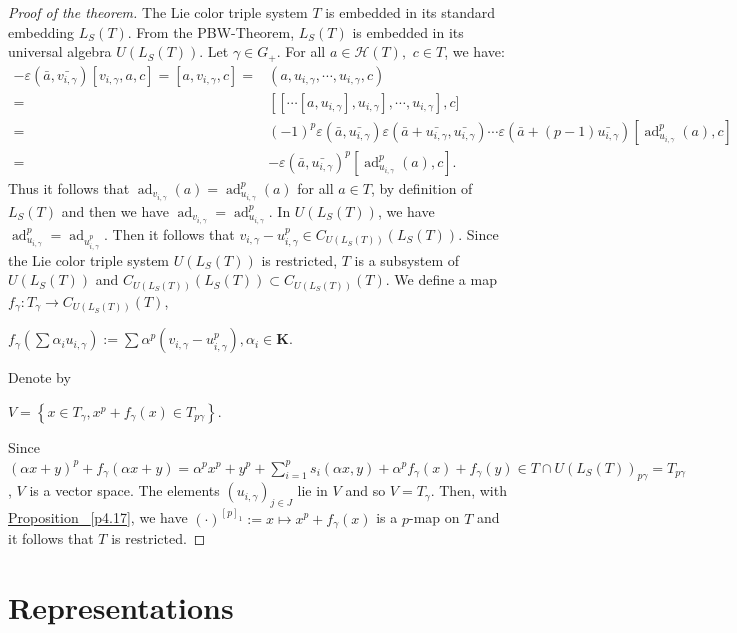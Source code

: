 \documentclass[11pt, twoside]{article}
\DeclareMathOperator{\ad}{ad}
\begin{document}
\begin{proof}[Proof of the theorem]
    The Lie color triple system $T$ is embedded in its standard embedding $L_S(T)$. From the PBW-Theorem, $L_S(T) $ is embedded in its universal algebra $U(L_S(T)) $. Let $\gamma\in G_+ $. For all $a\in \mathcal{H}(T),$  $ c\in T $, we have: \begin{align*}
        -\varepsilon(\bar{a},\bar{v_{i,\gamma}})[v_{i,\gamma},a,c]= [a,v_{i,\gamma},c]= & (a,u_{i,\gamma},\cdots,u_{i,\gamma},c) \\ =& [[\cdots [a,u_{i,\gamma}],u_{i,\gamma}],\cdots ,u_{i,\gamma}],c ] \\ =& (-1)^p\varepsilon(\bar{a},\bar{u_{i,\gamma}}) \varepsilon(\bar{a}+\bar{u_{i,\gamma}},\bar{u_{i,\gamma}})\cdots\varepsilon(\bar{a}+(p-1)\bar{u_{i,\gamma}})[\ad_{u_{i,\gamma}}^p(a),c] \\ =&  -\varepsilon(\bar{a},\bar{u_{i,\gamma}})^p[\ad_{u_{i,\gamma}}^p(a),c] .\end{align*} Thus it follows that $\ad_{v_{i,\gamma}}(a)= \ad_{u_{i,\gamma}}^p(a)$ for all $a\in T$, by definition of $L_S(T)$ and then we have $ \ad_{v_{i,\gamma}}= \ad_{u_{i,\gamma}}^p$. In $U(L_S(T)) $, we have $ \ad_{u_{i,\gamma}}^p=\ad_{u_{i,\gamma}^p} $. Then it follows that $v_{i,\gamma} - u_{i,\gamma}^p  \in C_{U(L_S(T))}(L_S(T)) $. Since the  Lie color triple system $U(L_S(T)) $ is restricted, $T$ is a subsystem of $U(L_S(T)) $ and $ C_{U(L_S(T))}(L_S(T))\subset C_{U(L_S(T))}(T) $. We define a map $f_\gamma: T_\gamma\to C_{U(L_S(T))}(T) $, \begin{center}
        $f_\gamma(\sum\alpha_iu_{i,\gamma}):= \sum\alpha^p(v_{i,\gamma}-u_{i,\gamma}^p), \alpha_i\in \mathbf{K} $. \end{center} Denote by \begin{center}
        $ V = \left\{x\in T_\gamma , x^p+f_\gamma(x) \in T_{p\gamma}\right\} $. \end{center} Since $(\alpha x+y)^p+f_\gamma(\alpha x+y) = \alpha^px^p+y^p+\sum\limits_{i=1}^ps_i(\alpha x,y) + \alpha^pf_\gamma(x)+ f_\gamma(y) \in T\cap U(L_S(T))_{p\gamma}= T_{p\gamma} $, $V$ is a vector space. The elements $(u_{i,\gamma})_{j\in J}$ lie in $V$ and so $V=T_\gamma$. Then, with  \hyperref[p4.17]{Proposition ~\ref*{p4.17}},  we have $ (\cdot)^{[p]_1}:= x\mapsto x^p+f_\gamma(x) $ is a $p$-map on $T$ and it follows that $T$ is restricted.
\end{proof}


\section{Representations}\label{s5}
\end{document}
